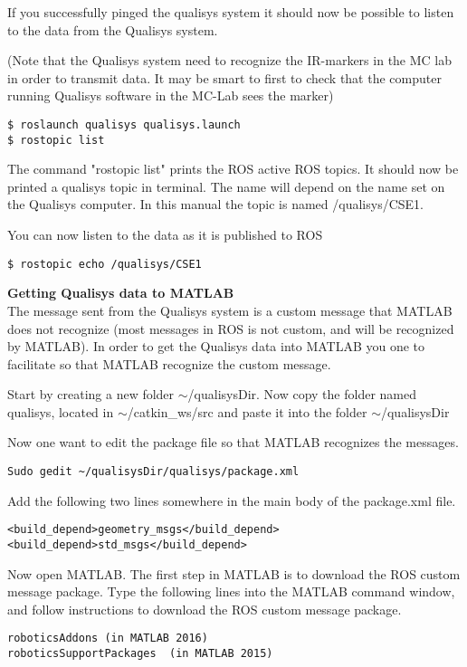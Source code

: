 \documentclass[12pt,a4paper,twoside]{report}
\begin{document}
If you successfully pinged  the qualisys system it should now be possible to listen to the data from the Qualisys system. 


(Note that the Qualisys system need to recognize the IR-markers in the MC lab in order to transmit data. It may  be smart to first to check that the computer running Qualisys software in the MC-Lab sees the marker)
\begin{lstlisting}[style=BashInputStyle]
$ roslaunch qualisys qualisys.launch
$ rostopic list
\end{lstlisting}
The command "rostopic list"  prints the ROS active ROS topics. It should now be printed a qualisys topic in terminal. The name will depend on the name set on the Qualisys computer. In this manual the topic is named /qualisys/CSE1.

You can now listen to the data as it is published to ROS
\begin{lstlisting}[style=BashInputStyle]
$ rostopic echo /qualisys/CSE1
\end{lstlisting}



\textbf{Getting Qualisys data to MATLAB}\\
The message sent from the Qualisys system is a custom message that MATLAB does not recognize (most messages in ROS is not custom, and will be recognized by MATLAB).
In order to get the Qualisys data into MATLAB you one to facilitate so that MATLAB recognize the custom message.


Start by  creating a new folder $\sim$/qualisysDir. Now copy the folder named qualisys, located in $\sim$/catkin\_ws/src and paste it into the folder  $\sim$/qualisysDir
\newline


Now one want to edit the package file so that MATLAB recognizes the messages.
\begin{lstlisting}[style=BashInputStyle]
Sudo gedit ~/qualisysDir/qualisys/package.xml
\end{lstlisting}

Add the following two lines somewhere in the main body of the package.xml file.

\begin{lstlisting}[style=BashInputStyle]
<build_depend>geometry_msgs</build_depend>
<build_depend>std_msgs</build_depend>
\end{lstlisting}


Now open MATLAB. 
The first step in MATLAB is to download the ROS custom message package. Type the following lines into the MATLAB command window, and follow instructions to download the ROS custom message package. 
\begin{lstlisting}[style=BashInputStyle]
roboticsAddons (in MATLAB 2016)
roboticsSupportPackages  (in MATLAB 2015)
\end{lstlisting}
\end{document}
